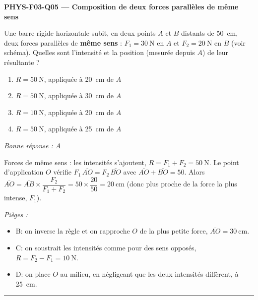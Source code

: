 \documentclass[11pt,a4paper]{article}
\newcommand{\vv}[1]{\vec{#1}}\newcommand{\ds}{\displaystyle}
\begin{document}
\noindent\textbf{PHYS-F03-Q05 --- Composition de deux forces parallèles de même sens}\par
Une barre rigide horizontale subit, en deux points $A$ et $B$ distants de \qty{50}{\centi\metre}, deux
forces parallèles de \textbf{même sens} : $F_1 = \qty{30}{\newton}$ en $A$ et $F_2 = \qty{20}{\newton}$
en $B$ (voir schéma). Quelles sont l'intensité et la position (mesurée depuis $A$) de leur résultante ?
\begin{center}
\end{center}
\begin{enumerate}[label=\Alph*)]
\item $R = \qty{50}{\newton}$, appliquée à \qty{20}{\centi\metre} de $A$
\item $R = \qty{50}{\newton}$, appliquée à \qty{30}{\centi\metre} de $A$
\item $R = \qty{10}{\newton}$, appliquée à \qty{20}{\centi\metre} de $A$
\item $R = \qty{50}{\newton}$, appliquée à \qty{25}{\centi\metre} de $A$
\end{enumerate}
\textit{Bonne réponse : A}\par
Forces de même sens : les intensités s'ajoutent, $R = F_1 + F_2 = \qty{50}{\newton}$. Le point
d'application $O$ vérifie $F_1\,\overline{AO} = F_2\,\overline{BO}$ avec $\overline{AO}+\overline{BO} = 50$.
Alors $\overline{AO} = \overline{AB}\times\dfrac{F_2}{F_1+F_2} = 50\times\dfrac{20}{50} = \qty{20}{\centi\metre}$
(donc plus proche de la force la plus intense, $F_1$).\par
\textit{Pièges :}
\begin{itemize}
\item B: on inverse la règle et on rapproche $O$ de la plus petite force, $\overline{AO} = \qty{30}{\centi\metre}$.
\item C: on soustrait les intensités comme pour des sens opposés, $R = F_2 - F_1 = \qty{10}{\newton}$.
\item D: on place $O$ au milieu, en négligeant que les deux intensités diffèrent, à \qty{25}{\centi\metre}.
\end{itemize}
\vspace{8pt}\hrule\vspace{8pt}
\end{document}
